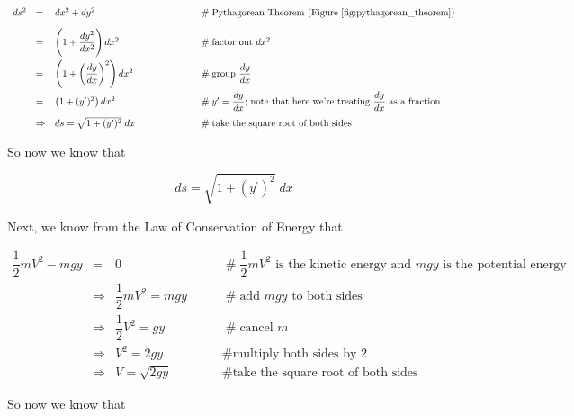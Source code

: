 \documentclass{article}
\theoremstyle{definition}
\begin{document}
\begin{equation*}
\begin{array}{lllll}
ds^2
&=& dx^2 + dy^2   												&\qquad \qquad \qquad \mathrel{\#} \text{Pythagorean Theorem (Figure \ref{fig:pythagorean_theorem})} \\
[10pt]
&=& \left ( 1 + \dfrac{dy^2}{dx^2} \right ) dx^2				&\qquad \qquad \qquad \mathrel{\#} \text{factor out $dx^2$} \\
[12pt]
&=& \left ( 1 + \left (\dfrac{dy}{dx} \right )^2 \right ) dx^2	&\qquad \qquad \qquad \mathrel{\#} \text{group $\dfrac{dy}{dx}$} \\
[12pt]
&=& \left ( 1 + (y^{\prime})^2 \right ) dx^2					&\qquad \qquad \qquad \mathrel{\#} \text{$y^{\prime} = \dfrac{dy}{dx}$; note that here we're treating $\dfrac{dy}{dx}$ as a fraction}\\
[10pt]
&\Rightarrow& ds = \sqrt{1 + (y^{\prime})^2} \; dx				&\qquad \qquad \qquad \mathrel{\#} \text{take the square root of both sides}
\end{array}
\end{equation*}

\bigskip
\noindent
So now we know that 

\begin{equation}
ds = \sqrt{1 + (y^{\prime})^2} \; dx	
\label{eqn:ds}
\end{equation}

\bigskip
\noindent
Next, we know from the Law of Conservation of Energy \cite{conservation_of_energy}
that 

\medskip
\begin{equation*}
\begin{array}{lllll}
\dfrac{1}{2} mV^2 - mgy  
&=& 0										&\qquad \mathrel{\#} \text{$\dfrac{1}{2} mV^2$ is the kinetic energy and $mgy$ is the potential energy} \\
[10pt]
&\Rightarrow& \dfrac{1}{2} mV^2 = mgy		&\qquad \mathrel{\#} \text{add $mgy$ to both sides} \\
[10pt]
&\Rightarrow& \dfrac{1}{2} V^2 = gy			&\qquad \mathrel{\#} \text{cancel $m$} \\
[10pt]
&\Rightarrow& V^2 = 2gy						&\qquad \mathrel{\#} \text{multiply both sides by 2} \\
[10pt]
&\Rightarrow& V = \sqrt{2gy}				&\qquad \mathrel{\#} \text{take the square root of both sides}
\end{array}
\end{equation*}


\bigskip
\noindent
So now we know that
\end{document}
